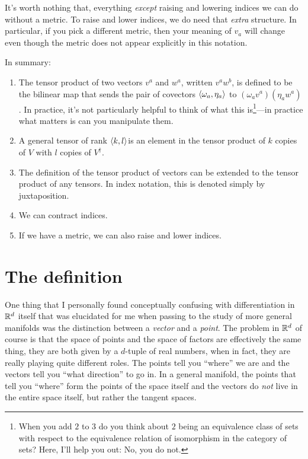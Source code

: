 It's worth nothing that, everything \emph{except} raising and lowering indices we can do without a metric.  To raise and lower indices, we do need that \emph{extra} structure.  In particular, if you pick a different metric, then your meaning of $v_a$ will change even though the metric does not appear explicitly in this notation.

In summary:
\begin{enumerate}
\item The tensor product of two vectors $v^a$ and $w^a$, written $v^aw^b$, is defined to be the bilinear map that sends the pair of covectors $\langle\omega _a,\eta _a\rangle$ to $(\omega _av^a)(\eta _aw^a)$.  In practice, it's not particularly helpful to think of what this is\footnote{When you add $2$ to $3$ do you think about $2$ being an equivalence class of sets with respect to the equivalence relation of isomorphism in the category of sets?  Here, I'll help you out:  No, you do not.}---in practice what matters is can you manipulate them.
\item A general tensor of rank $\langle k,l\rangle$is an element in the tensor product of $k$ copies of $V$ with $l$ copies of $V^{\dagger}$.
\item The definition of the tensor product of vectors can be extended to the tensor product of any tensors.  In index notation, this is denoted simply by juxtaposition.
\item We can contract indices.
\item If we have a metric, we can also raise and lower indices.
\end{enumerate}

\section{The definition}

One thing that I personally found conceptually confusing with differentiation in $\mathbb{R} ^d$ itself that was elucidated for me when passing to the study of more general manifolds was the distinction between a \emph{vector} and a \emph{point}.  The problem in $\mathbb{R} ^d$ of course is that the space of points and the space of factors are effectively the same thing, they are both given by a $d$-tuple of real numbers, when in fact, they are really playing quite different roles.  The points tell you ``where'' we are and the vectors tell you ``what direction'' to go in.  In a general manifold, the points that tell you ``where'' form the points of the space itself and the vectors do \emph{not} live in the entire space itself, but rather the tangent spaces.


